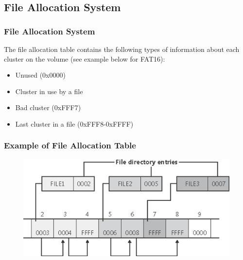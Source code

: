 \subsection{File Allocation System} %
\begin{frame}[fragile]
    \frametitle{File Allocation System}
    The file allocation table contains the following {\color{red}types} of information about each cluster on the volume (see example below for FAT16):

    \begin{itemize}
        \item Unused (0x0000)
        \item Cluster in use by a file
        \item Bad cluster (0xFFF7)
        \item Last cluster in a file (0xFFF8-0xFFFF)
    \end{itemize}
\end{frame}
% 
% 
% 
\begin{frame}[fragile]
    \frametitle{Example of File Allocation Table}
    \begin{figure}
  \includegraphics[width=0.9\linewidth]{figs/FAT-example.png}
  \end{figure}
\end{frame}
